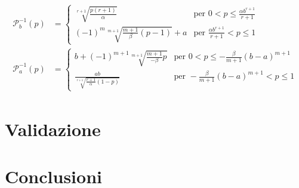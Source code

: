 \documentclass[paper=a4, fontsize=11pt]{scrartcl}
\numberwithin{equation}{section}
\numberwithin{figure}{section}
\numberwithin{table}{section}
\begin{document}
\begin{align}
\begin{split}
\mathcal{P}^{-1}_b(p) &= \left\{ \begin{array}{ll}
         \sqrt[r+1]{\frac{p(r+1)}{\alpha}}   & \text{per } 0 < p \leq \frac{\alpha b^{r+1}}{r+1} \\
         (-1)^m \sqrt[m+1]{
         	\frac{m+1}{\beta}(p-1)} + a      & \text{per } \frac{\alpha b^{r+1}}{r+1} < p \leq 1 
         \end{array}\right. \\
\mathcal{P}^{-1}_a(p) &= \left\{ \begin{array}{ll}
         b + (-1)^{m+1} \sqrt[m+1]{
         	\frac{m+1}{-\beta} p}            & \text{per } 0 < p \leq - \frac{\beta}{m+1} (b-a)^{m+1} \\
         \frac{ab}{\sqrt[r+1]{
         	\frac{r+1}{\alpha}(1-p)}}        & \text{per } - \frac{\beta}{m+1} (b-a)^{m+1} < p \leq 1
         \end{array}\right.
\end{split}
\end{align}

\section{Validazione}

\section{Conclusioni}
\end{document}
